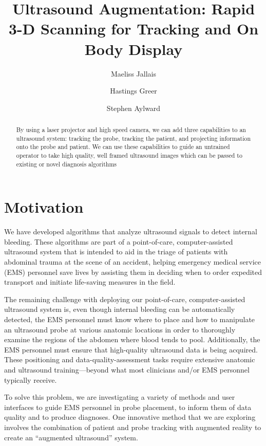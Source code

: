 \documentclass{llncs}
\begin{document}
%
\frontmatter
%
\pagestyle{headings}
\title{Ultrasound Augmentation: Rapid 3-D Scanning for Tracking and On Body Display}
\author{Maeliss Jallais \and Hastings Greer \and Stephen Aylward}
%
\mainmatter
\maketitle

\begin{abstract}
By using a laser projector and high speed camera, we can add three capabilities to an ultrasound system: tracking the probe, tracking the patient, and projecting information onto the probe and patient. We can use these capabilities to guide an untrained operator to take high quality, well framed ultrasound images which can be passed to existing or novel diagnosis algorithms
\end{abstract}


\section{Motivation}
We have developed algorithms that analyze ultrasound signals to detect internal bleeding.  These algorithms are part of a point-of-care, computer-assisted ultrasound system that is intended to aid in the triage of patients with abdominal trauma at the scene of an accident, helping emergency medical service (EMS) personnel save lives by assisting them in deciding when to order expedited transport and initiate life-saving measures in the field.

The remaining challenge with deploying our point-of-care, computer-assisted ultrasound system is, even though internal bleeding can be automatically detected, the EMS personnel must know where to place and how to manipulate an ultrasound probe at various anatomic locations in order to thoroughly examine the regions of the abdomen where blood tends to pool. Additionally, the EMS personnel must ensure that high-quality ultrasound data is being acquired. These positioning and data-quality-assessment tasks require extensive anatomic and ultrasound training—beyond what most clinicians and/or EMS personnel typically receive.

To solve this problem, we are investigating a variety of methods and user interfaces to guide EMS personnel in probe placement, to inform them of data quality and to produce diagnoses. One innovative method that we are exploring involves the combination of  patient and probe tracking with augmented reality to create an “augmented ultrasound” system.
\end{document}
